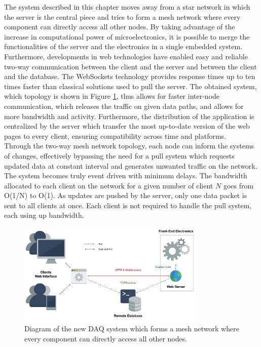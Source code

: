     The system described in this chapter moves away from a star network in which the server is the central piece and tries to form a mesh network where every component can directly access all other nodes. By taking advantage of the increase in computational power of microelectronics, it is possible to merge the functionalities of the server and the electronics in a single embedded system. Furthermore, developments in web technologies have enabled easy and reliable two-way communication between the client and the server and between the client and the database. The WebSockets technology provides response times up to ten times faster than classical solutions used to pull the server. The obtained system, which topology is shown in Figure \ref{fig:III-2-system-new}, thus allows for faster inter-node communication, which releases the traffic on given data paths, and allows for more bandwidth and activity. Furthermore, the distribution of the application is centralized by the server which transfer the most up-to-date version of the web pages to every client, ensuring compatibility across time and platforms. \\

    Through the two-way mesh network topology, each node can inform the systems of changes, effectively bypassing the need for a pull system which requests updated data at constant interval and generates unwanted traffic on the network. The system becomes truly event driven with minimum delays. The bandwidth allocated to each client on the network for a given number of client $ N $ goes from O(1/N) to O(1). As updates are pushed by the server, only one data packet is sent to all clients at once. Each client is not required to handle the pull system, each using up bandwidth.

    \begin{figure}[t!]
      \centering
      \includegraphics[width=0.8\textwidth]{img/III-2-web-daq/new-sys.png}
      \caption{Diagram of the new DAQ system which forms a mesh network where every component can directly access all other nodes.}
      \label{fig:III-2-system-new}
    \end{figure}

